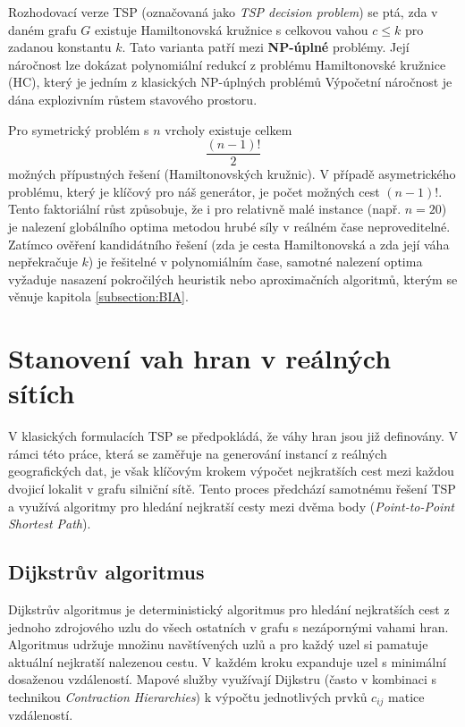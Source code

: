 Rozhodovací verze TSP (označovaná jako \textit{TSP decision problem}) se ptá, zda v daném grafu $G$ existuje Hamiltonovská kružnice s celkovou vahou $c \leq k$ pro zadanou konstantu $k$. Tato varianta patří mezi \textbf{NP-úplné} problémy. Její náročnost lze dokázat polynomiální redukcí z problému Hamiltonovské kružnice (HC), který je jedním z klasických NP-úplných problémů %
Výpočetní náročnost je dána explozivním růstem stavového prostoru. 

Pro symetrický problém s $n$ vrcholy existuje celkem
\begin{equation}
    \frac{(n-1)!}{2}
\end{equation}
možných přípustných řešení (Hamiltonovských kružnic). V případě asymetrického problému, který je klíčový pro náš generátor, je počet možných cest $(n-1)!$. %
Tento faktoriální růst způsobuje, že i pro relativně malé instance (např. $n=20$) je nalezení globálního optima metodou hrubé síly v reálném čase neproveditelné. Zatímco ověření kandidátního řešení (zda je cesta Hamiltonovská a zda její váha nepřekračuje $k$) je řešitelné v polynomiálním čase, samotné nalezení optima vyžaduje nasazení pokročilých heuristik nebo aproximačních algoritmů, kterým se věnuje kapitola \ref{subsection:BIA}.


\section{Stanovení vah hran v reálných sítích}
V klasických formulacích TSP se předpokládá, že váhy hran jsou již definovány. V rámci této práce, která se zaměřuje na generování instancí z reálných geografických dat, je však klíčovým krokem výpočet nejkratších cest mezi každou dvojicí lokalit v grafu silniční sítě. Tento proces předchází samotnému řešení TSP a využívá algoritmy pro hledání nejkratší cesty mezi dvěma body (\textit{Point-to-Point Shortest Path}).

\subsection{Dijkstrův algoritmus}
Dijkstrův algoritmus je deterministický algoritmus pro hledání nejkratších cest z jednoho zdrojového uzlu do všech ostatních v grafu s nezápornými vahami hran. Algoritmus udržuje množinu navštívených uzlů a pro každý uzel si pamatuje aktuální nejkratší nalezenou cestu. V každém kroku expanduje uzel s minimální dosaženou vzdáleností. Mapové služby využívají Dijkstru (často v kombinaci s technikou \textit{Contraction Hierarchies}) k výpočtu jednotlivých prvků $c_{ij}$ matice vzdáleností.


